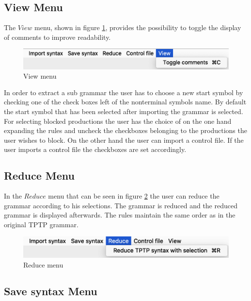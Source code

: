 \subsection{View Menu}\label{sec:ConceptGUIViewMenu}

The $View$ menu, shown in figure \ref{fig:view}, provides the possibility to toggle the display of comments to improve readability.

\begin{figure}[H]
\centering
\includegraphics[width=.7\textwidth]{images/view.png}
\caption{View menu}
\label{fig:view}
\end{figure}

In order to extract a sub grammar the user has to choose a new start symbol by checking one of the check boxes left of the nonterminal symbols name. By default the start symbol that has been selected after importing the grammar is selected. For selecting blocked productions the user has the choice of on the one hand expanding the rules and uncheck the checkboxes belonging to the productions the user wishes to block. On the other hand the user can import a control file. If the user imports a control file the checkboxes are set accordingly.

\subsection{Reduce Menu}\label{sec:ConceptGUIReduceMenu}

In the $Reduce$ menu that can be seen in figure \ref{fig:reduce} the user can reduce the grammar according to his selections. The grammar is reduced and the reduced grammar is displayed afterwards. The rules maintain the same order as in the original \ac{TPTP} grammar.

\begin{figure}[H]
\centering
\includegraphics[width=.7\textwidth]{images/reduce.png}
\caption{Reduce menu}
\label{fig:reduce}
\end{figure}

\subsection{Save syntax Menu}\label{sec:ConceptGUISaveSyntaxMenu}

